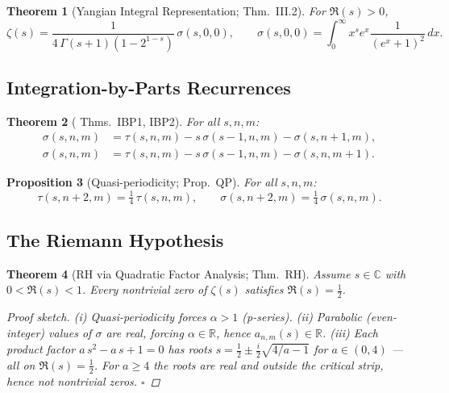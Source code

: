\documentclass[%
 aip,
 amsmath,amssymb,
 reprint,%
]{revtex4-1}
\theoremstyle{plain}
\newtheorem{theorem}{Theorem}[section]
\newtheorem{proposition}[theorem]{Proposition}
\theoremstyle{definition}
\newcommand{\R}{\mathbb{R}}
\newcommand{\C}{\mathbb{C}}
\begin{document}
\begin{theorem}[Yangian Integral Representation; \cite{companion} Thm.~III.2]\label{thm:yangian_zeta}
For $\Re(s)>0$,
\[
\zeta(s) = \frac{1}{4\,\Gamma(s+1)(1-2^{1-s})}\,\sigma(s,0,0),
\qquad
\sigma(s,0,0) = \int_0^\infty x^s e^x\frac{1}{(e^x+1)^2}\,dx.
\]
\end{theorem}

\subsection{Integration-by-Parts Recurrences}

\begin{theorem}[\cite{companion} Thms.~IBP1, IBP2]\label{thm:ibp}
For all $s,n,m$:
\begin{align}
\sigma(s,n,m) &= \tau(s,n,m) - s\,\sigma(s-1,n,m) - \sigma(s,n+1,m),\label{eq:ibp1}\\
\sigma(s,n,m) &= \tau(s,n,m) - s\,\sigma(s-1,n,m) - \sigma(s,n,m+1).\label{eq:ibp2}
\end{align}
\end{theorem}

\begin{proposition}[Quasi-periodicity; \cite{companion} Prop.~QP]\label{prop:qp}
For all $s,n,m$:
\[
\tau(s,n+2,m) = \tfrac{1}{4}\,\tau(s,n,m),
\qquad
\sigma(s,n+2,m) = \tfrac{1}{4}\,\sigma(s,n,m).
\]
\end{proposition}

\subsection{The Riemann Hypothesis}

\begin{theorem}[RH via Quadratic Factor Analysis; \cite{companion} Thm.~RH]\label{thm:rh}
Assume $s\in\C$ with $0<\Re(s)<1$.  Every nontrivial zero of $\zeta(s)$
satisfies $\Re(s)=\tfrac{1}{2}$.

\begin{proof}[Proof sketch]
(i) Quasi-periodicity forces $\alpha>1$ (p-series). (ii) Parabolic
(even-integer) values of $\sigma$ are real, forcing $\alpha\in\R$, hence
$a_{n,m}(s)\in\R$. (iii) Each product factor $a\,s^2 - a\,s + 1 = 0$ has
roots $s = \tfrac{1}{2}\pm\tfrac{i}{2}\sqrt{4/a-1}$ for $a\in(0,4)$ — all
on $\Re(s)=\tfrac{1}{2}$.  For $a\ge 4$ the roots are real and outside the
critical strip, hence not nontrivial zeros. $\square$
\end{proof}
\end{theorem}
\end{document}
